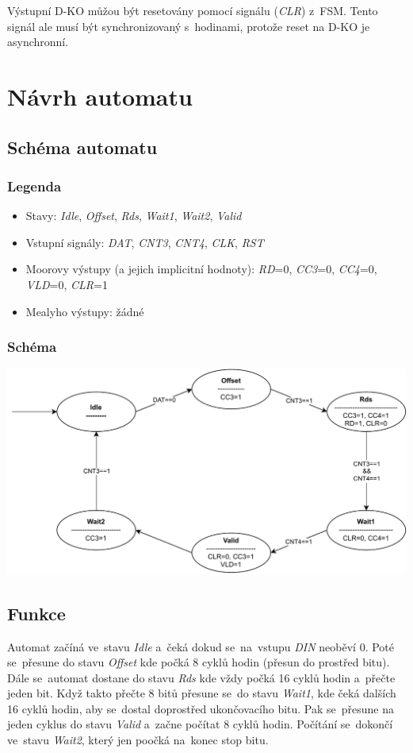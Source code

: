 \documentclass{article}
\begin{document}
Výstupní D-KO můžou být resetovány pomocí signálu (\emph{CLR}) z~FSM. Tento
signál ale musí být synchronizovaný s~hodinami, protože reset na D-KO je
asynchronní.

\newpage

\section{Návrh automatu}

\subsection{Schéma automatu}

\subsubsection{Legenda}

\begin{itemize}
    \item Stavy: \emph{Idle}, \emph{Offset}, \emph{Rds}, \emph{Wait1},
          \emph{Wait2}, \emph{Valid}
    \item Vstupní signály: \emph{DAT}, \emph{CNT3}, \emph{CNT4}, \emph{CLK},
          \emph{RST}
    \item Moorovy výstupy (a jejich implicitní hodnoty): \emph{RD}=0,
          \emph{CC3}=0, \emph{CC4}=0, \emph{VLD}=0, \emph{CLR}=1
    \item Mealyho výstupy: žádné
\end{itemize}

\subsubsection{Schéma}

\includegraphics*[scale=0.9]{assets/FSM.pdf}

\subsection{Funkce}
Automat začíná ve~stavu \emph{Idle} a~čeká dokud se~na~vstupu \emph{DIN}
neoběví 0. Poté se~přesune do stavu \emph{Offset} kde počká 8 cyklů hodin
(přesun do prostřed bitu). Dále se~automat dostane do stavu \emph{Rds} kde vždy
počká 16 cyklů hodin a~přečte jeden bit. Když takto přečte 8 bitů přesune se~do
stavu \emph{Wait1}, kde čeká dalších 16 cyklů hodin, aby se~dostal doprostřed
ukončovacího bitu. Pak se~přesune na jeden cyklus do stavu \emph{Valid} a~začne
počítat 8 cyklů hodin. Počítání se~dokončí ve~stavu \emph{Wait2}, který jen
poočká na~konec stop bitu.
\end{document}
